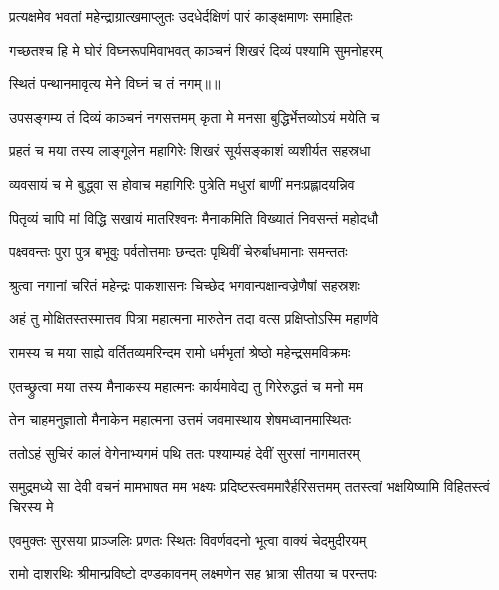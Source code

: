 \twolineshloka
{प्रत्यक्षमेव भवतां महेन्द्राग्रात्खमाप्लुतः}
{उदधेर्दक्षिणं पारं काङ्क्षमाणः समाहितः} %

\twolineshloka
{गच्छतश्च हि मे घोरं विघ्नरूपमिवाभवत्}
{काञ्चनं शिखरं दिव्यं पश्यामि सुमनोहरम्} %

{स्थितं पन्थानमावृत्य मेने विघ्नं च तं नगम्॥॥} %

\addtocounter{shlokacount}{1}

\twolineshloka
{उपसङ्गम्य तं दिव्यं काञ्चनं नगसत्तमम्}
{कृता मे मनसा बुद्धिर्भेत्तव्योऽयं मयेति च} %

\twolineshloka
{प्रहतं च मया तस्य लाङ्गूलेन महागिरेः}
{शिखरं सूर्यसङ्काशं व्यशीर्यत सहस्रधा} %

\twolineshloka
{व्यवसायं च मे बुद्ध्वा स होवाच महागिरिः}
{पुत्रेति मधुरां बाणीं मनःप्रह्लादयन्निव} %

\twolineshloka
{पितृव्यं चापि मां विद्धि सखायं मातरिश्वनः}
{मैनाकमिति विख्यातं निवसन्तं महोदधौ} %

\twolineshloka
{पक्ष्ववन्तः पुरा पुत्र बभूवुः पर्वतोत्तमाः}
{छन्दतः पृथिवीं चेरुर्बाधमानाः समन्ततः} %

\twolineshloka
{श्रुत्वा नगानां चरितं महेन्द्रः पाकशासनः}
{चिच्छेद भगवान्पक्षान्वज्रेणैषां सहस्रशः} %

\twolineshloka
{अहं तु मोक्षितस्तस्मात्तव पित्रा महात्मना}
{मारुतेन तदा वत्स प्रक्षिप्तोऽस्मि महार्णवे} %

\twolineshloka
{रामस्य च मया साह्ये वर्तितव्यमरिन्दम}
{रामो धर्मभृतां श्रेष्ठो महेन्द्रसमविक्रमः} %

\twolineshloka
{एतच्छ्रुत्वा मया तस्य मैनाकस्य महात्मनः}
{कार्यमावेद्य तु गिरेरुद्धतं च मनो मम} %

\twolineshloka
{तेन चाहमनुज्ञातो मैनाकेन महात्मना}
{उत्तमं जवमास्थाय शेषमध्वानमास्थितः} %

\twolineshloka
{ततोऽहं सुचिरं कालं वेगेनाभ्यगमं पथि}
{ततः पश्याम्यहं देवीं सुरसां नागमातरम्} %

\threelineshloka
{समुद्रमध्ये सा देवी वचनं मामभाषत}
{मम भक्ष्यः प्रदिष्टस्त्वममारैर्हरिसत्तमम्}
{ततस्त्वां भक्षयिष्यामि विहितस्त्वं चिरस्य मे} %

\twolineshloka
{एवमुक्तः सुरसया प्राञ्जलिः प्रणतः स्थितः}
{विवर्णवदनो भूत्वा वाक्यं चेदमुदीरयम्} %

\twolineshloka
{रामो दाशरथिः श्रीमान्प्रविष्टो दण्डकावनम्}
{लक्ष्मणेन सह भ्रात्रा सीतया च परन्तपः} %

